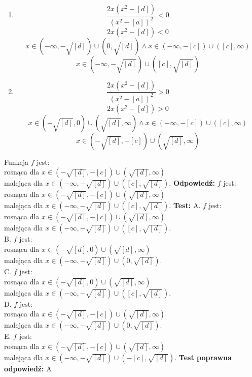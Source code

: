 \documentclass[12pt, a4paper]{article}
\theoremstyle{definition} %
\newcommand{\rozwStop}{\newline}                                            %
\newcommand{\odpStart}{\noindent \textbf{Odpowiedź:}\newline}    %
\newcommand{\odpStop}{\newline}                                             %
\newcommand{\testStart}{\noindent \textbf{Test:}\newline} %
\newcommand{\testStop}{\newline} %
\newcommand{\kluczStart}{\noindent \textbf{Test poprawna odpowiedź:}\newline} %
\newcommand{\kluczStop}{\newline} %
\begin{document}
\begin{enumerate}
\item 
$$\frac{2x(x^2-[d])}{(x^2-[a])^2}<0$$
$$2x(x^2-[d])<0$$
$$x\in \left(-\infty, -\sqrt{[d]}\right) \cup \left(0,\sqrt{[d]}\right) \land x \in \left(-\infty,-[c] \right) \cup \left([c], \infty \right) $$
$$x\in \left(-\infty, -\sqrt{[d]}\right) \cup \left([c],\sqrt{[d]}\right)$$
\item 
$$\frac{2x(x^2-[d])}{(x^2-[a])^2}>0$$
$$2x(x^2-[d])>0$$
$$x\in \left(-\sqrt{[d]},0 \right) \cup \left(\sqrt{[d]}, \infty \right) \land x \in \left(-\infty,-[c] \right) \cup \left([c], \infty \right) $$
$$x\in \left(-\sqrt{[d]},-[c] \right) \cup \left(\sqrt{[d]}, \infty \right)$$
\end{enumerate}
Funkcja $f$ jest: \\ rosnąca dla $x\in \left(-\sqrt{[d]},-[c] \right) \cup \left(\sqrt{[d]}, \infty \right)$ \\ malejąca dla $x\in \left(-\infty, -\sqrt{[d]}\right) \cup \left([c],\sqrt{[d]}\right)$.
\rozwStop
\odpStart
$f$ jest: \\ rosnąca dla $x\in \left(-\sqrt{[d]},-[c] \right) \cup \left(\sqrt{[d]}, \infty \right)$ \\ malejąca dla $x\in \left(-\infty, -\sqrt{[d]}\right) \cup \left([c],\sqrt{[d]}\right)$.
\odpStop
\testStart
A. $f$ jest: \\ rosnąca dla $x\in \left(-\sqrt{[d]},-[c] \right) \cup \left(\sqrt{[d]}, \infty \right)$ \\ malejąca dla $x\in \left(-\infty, -\sqrt{[d]}\right) \cup \left([c],\sqrt{[d]}\right)$.\\
B. $f$ jest: \\ rosnąca dla $x\in\left(-\sqrt{[d]},0 \right) \cup \left(\sqrt{[d]}, \infty \right)$ \\ malejąca dla $x\in \left(-\infty, -\sqrt{[d]}\right) \cup \left(0,\sqrt{[d]}\right)$.\\
C. $f$ jest: \\ rosnąca dla $x\in \left(-\sqrt{[d]},0 \right) \cup \left(\sqrt{[d]}, \infty \right)$ \\ malejąca dla $x\in \left(-\infty, -\sqrt{[d]}\right) \cup \left([c],\sqrt{[d]}\right)$.\\
D. $f$ jest: \\ rosnąca dla $x\in \left(-\sqrt{[d]},-[c] \right) \cup \left(\sqrt{[d]}, \infty \right)$ \\ malejąca dla $x\in \left(-\infty, -\sqrt{[d]}\right) \cup \left(0,\sqrt{[d]}\right)$.\\
E. $f$ jest: \\ rosnąca dla $x\in \left(-\sqrt{[d]},-[c] \right) \cup \left(\sqrt{[d]}, \infty \right)$ \\ malejąca dla $x\in \left(-\infty, -\sqrt{[d]}\right) \cup \left(-[c],\sqrt{[d]}\right)$.
\testStop
\kluczStart
A
\kluczStop
\end{document}
